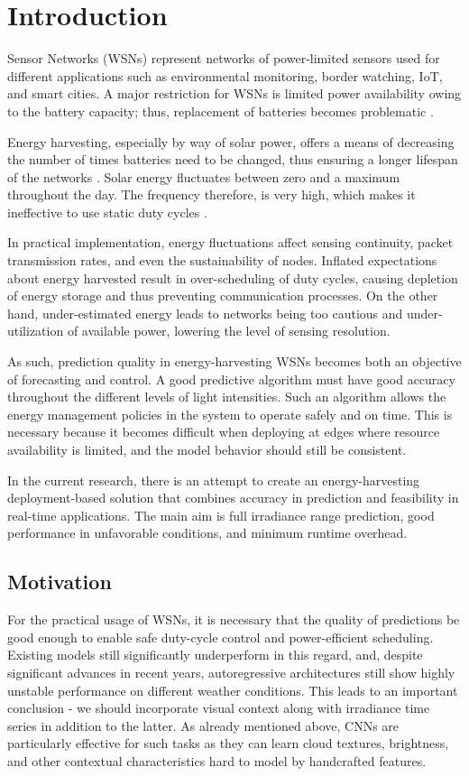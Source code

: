 \documentclass[journal]{IEEEtran}
\begin{document}
\section{Introduction}
 Sensor Networks (WSNs) represent networks of power-limited sensors used for different applications such as environmental monitoring, border watching, IoT, and smart cities\cite{ref1}. A major restriction for WSNs is limited power availability owing to the battery capacity; thus, replacement of batteries becomes problematic \cite{ref2}.

Energy harvesting, especially by way of solar power, offers a means of decreasing the number of times batteries need to be changed, thus ensuring a longer lifespan of the networks \cite{ref3}. Solar energy fluctuates between zero and a maximum throughout the day. The frequency therefore, is very high, which makes it ineffective to use static duty cycles \cite{ref4}.

In practical implementation, energy fluctuations affect sensing continuity, packet transmission rates, and even the sustainability of nodes. Inflated expectations about energy harvested result in over-scheduling of duty cycles, causing depletion of energy storage and thus preventing communication processes. On the other hand, under-estimated energy leads to networks being too cautious and under-utilization of available power, lowering the level of sensing resolution.

As such, prediction quality in energy-harvesting WSNs becomes both an objective of forecasting and control. A good predictive algorithm must have good accuracy throughout the different levels of light intensities. Such an algorithm allows the energy management policies in the system to operate safely and on time. This is necessary because it becomes difficult when deploying at edges where resource availability is limited, and the model behavior should still be consistent.

In the current research, there is an attempt to create an energy-harvesting deployment-based solution that combines accuracy in prediction and feasibility in real-time applications. The main aim is full irradiance range prediction, good performance in unfavorable conditions, and minimum runtime overhead.

\subsection{Motivation}
For the practical usage of WSNs, it is necessary that the quality of predictions be good enough to enable safe duty-cycle control and power-efficient scheduling. Existing models still significantly underperform in this regard, and, despite significant advances in recent years, autoregressive architectures still show highly unstable performance on different weather conditions. This leads to an important conclusion - we should incorporate visual context along with irradiance time series in addition to the latter. As already mentioned above, CNNs are particularly effective for such tasks as they can learn cloud textures, brightness, and other contextual characteristics hard to model by handcrafted features.
\end{document}
